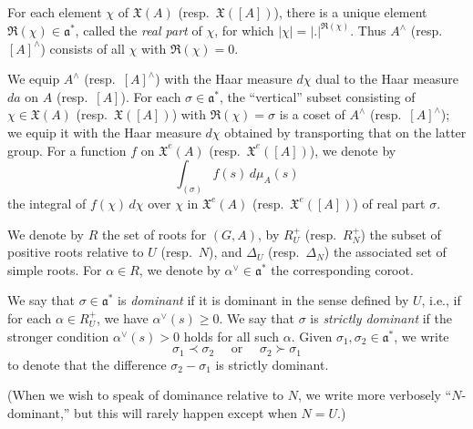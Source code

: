 For each element $\chi$ of $\mathfrak{X}(A)$ (resp.\ $\mathfrak{X}([A])$), there is a unique element $\Re(\chi) \in \mathfrak{a}^*$, called the \emph{real part} of $\chi$, for which $|\chi| = |.|^{\Re(\chi)}$.  Thus $A^\wedge$ (resp.\ $[A]^\wedge$) consists of all $\chi$ with $\Re(\chi) = 0$.

We equip $A^\wedge$ (resp.\ $[A]^\wedge$) with the Haar measure $d \chi$ dual to the Haar measure $d a$ on $A$ (resp.\ $[A]$).  For each $\sigma \in \mathfrak{a}^*$, the ``vertical'' subset consisting of $\chi \in \mathfrak{X}(A)$ (resp.\ $\mathfrak{X}([A])$) with $\Re(\chi) = \sigma$ is a coset of $A^\wedge$ (resp.\ $[A]^\wedge$); we equip it with the Haar measure $d \chi$ obtained by transporting that on the latter group.  For a function $f$ on $\mathfrak{X}^e(A)$ (resp.\ $\mathfrak{X}^e([A])$), we denote by 
\begin{equation}\label{eq:int-_sigma-fs}
  \int_{(\sigma)} f(s) \, d \mu_A(s)
\end{equation}
the integral of $f(\chi) \, d \chi$ over $\chi$ in $\mathfrak{X}^e(A)$ (resp.\ $\mathfrak{X}^e([A])$) of real part $\sigma$.

We denote by $R$ the set of roots for $(G,A)$, by $R_U^+$ (resp.\ $R_N^+$) the subset of positive roots relative to $U$ (resp.\ $N$), and $\Delta_U$ (resp.\ $\Delta_N$) the associated set of simple roots.   For $\alpha \in R$, we denote by $\alpha^\vee \in \mathfrak{a}^*$ the corresponding coroot.

We say that $\sigma \in \mathfrak{a}^*$ is \emph{dominant} if it is dominant in the sense defined by $U$, i.e., if for each $\alpha \in R_U^+$, we have $\alpha^\vee(s) \geq 0$.  We say that $\sigma$ is \emph{strictly dominant} if the stronger condition $\alpha^\vee(s) > 0$ holds for all such $\alpha$.  Given $\sigma_1, \sigma_2 \in \mathfrak{a}^*$, we write
\begin{equation*}
  \sigma_1 \prec \sigma_2 \quad \text{ or } \quad \sigma_2 \succ \sigma_1
\end{equation*}
to denote that the difference $\sigma_2 - \sigma_1$ is strictly dominant. 

(When we wish to speak of dominance relative to $N$, we write more verbosely ``$N$-dominant,'' but this will rarely happen except when $N = U$.)

